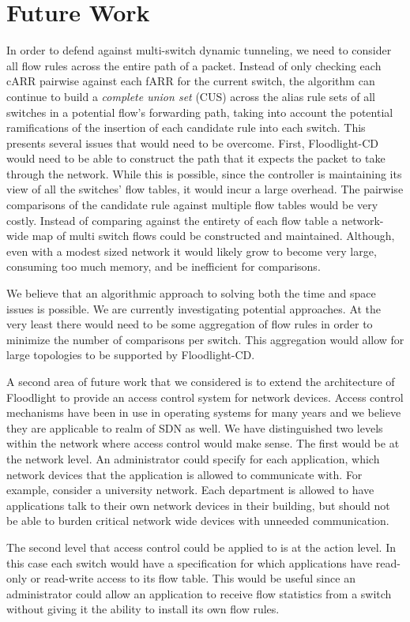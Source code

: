 \section{Future Work}
\label{sec:future}

In order to defend against multi-switch dynamic tunneling, we need to consider all flow rules across the entire path of a packet.
Instead of only checking each cARR pairwise against each fARR for the current switch, the algorithm can continue to build a \emph{complete union set} (CUS) across the alias rule sets of all switches in a potential flow's forwarding path, taking into account the potential ramifications of the insertion of each candidate rule into each switch. 
This presents several issues that would need to be overcome.
First, Floodlight-CD would need to be able to construct the path that it expects the packet to take through the network.
While this is possible, since the controller is maintaining its view of all the switches' flow tables, it would incur a large overhead.
The pairwise comparisons of the candidate rule against multiple flow tables would be very costly. 
Instead of comparing against the entirety of each flow table a network-wide map of multi switch flows could be constructed and maintained.
Although, even with a modest sized network it would likely grow to become very large, consuming too much memory, and be inefficient for comparisons.

We believe that an algorithmic approach to solving both the time and space issues is possible.
We are currently investigating potential approaches.
At the very least there would need to be some aggregation of flow rules in order to minimize the number of comparisons per switch.
This aggregation would allow for large topologies to be supported by Floodlight-CD.

A second area of future work that we considered is to extend the architecture of Floodlight to provide an access control system for network devices.
Access control mechanisms have been in use in operating systems for many years and we believe they are applicable to realm of SDN as well.
We have distinguished two levels within the network where access control would make sense.
The first would be at the network level.
An administrator could specify for each application, which network devices that the application is allowed to communicate with.
For example, consider a university network.
Each department is allowed to have applications talk to their own network devices in their building, but should not be able to burden critical network wide devices with unneeded communication.

The second level that access control could be applied to is at the action level.
In this case each switch would have a specification for which applications have read-only or read-write access to its flow table.
This would be useful since an administrator could allow an application to receive flow statistics from a switch without giving it the ability to install its own flow rules.


